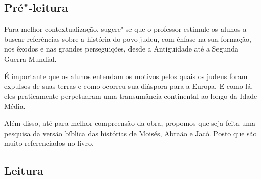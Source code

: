 \documentclass[12pt]{extarticle}
\begin{document}



\subsection{Pré"-leitura}


Para melhor contextualização, sugere"-se que o professor
estimule os alunos a buscar referências sobre a história do povo judeu,
com ênfase na sua formação, nos êxodos e nas grandes perseguições, desde
a Antiguidade até a Segunda Guerra Mundial.

É importante que os alunos entendam os motivos pelos quais os judeus
foram expulsos de suas terras e como ocorreu sua diáspora para a Europa.
E como lá, eles praticamente perpetuaram uma transumância continental ao
longo da Idade Média.

Além disso, até para melhor compreensão da obra, propomos que seja feita
uma pesquisa da versão bíblica das histórias de Moisés, Abraão e Jacó.
Posto que são muito referenciados no livro.

\subsection{Leitura}
\end{document}
